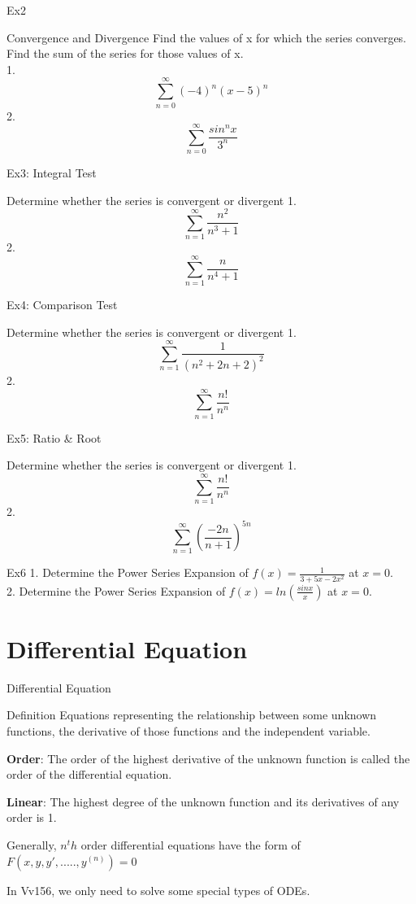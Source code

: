 \documentclass{beamer}
\begin{document}
\begin{frame}{Ex2}
    \begin{block}{Convergence and Divergence}
    Find the values of x for which the series converges. Find the sum of
the series for those values of x.\\
        1. $$\sum\limits_{n=0}^{\infty}(-4)^n(x-5)^n$$
        2. $$\sum\limits_{n=0}^{\infty}\frac{sin^n x}{3^n}$$
    \end{block}
\end{frame}
\begin{frame}{Ex3: Integral Test}
    \begin{block}{Determine whether the series is convergent or divergent}
    1.$$\sum\limits_{n=1}^{\infty} \frac{n^2}{n^3+1}$$
    2.$$\sum\limits_{n=1}^{\infty} \frac{n}{n^4+1}$$
    \end{block}
\end{frame}
\begin{frame}{Ex4: Comparison Test}
    \begin{block}{Determine whether the series is convergent or divergent}
    1.$$\sum\limits_{n=1}^{\infty} \frac{1}{(n^2+2n+2)^2}$$
    2.$$\sum\limits_{n=1}^{\infty} \frac{n!}{n^n}$$
    \end{block}
\end{frame}
\begin{frame}{Ex5: Ratio \& Root}
    \begin{block}{Determine whether the series is convergent or divergent}
    1.$$\sum\limits_{n=1}^{\infty} \frac{n!}{n^n}$$
    2.$$\sum\limits_{n=1}^{\infty} (\frac{-2n}{n+1})^{5n}$$
    \end{block}
\end{frame}
\begin{frame}{Ex6}
    1. Determine the Power Series Expansion of $f (x) = \frac{1}{3+5x-2x^2}$
at $x = 0$.\\
2. Determine the Power Series Expansion of $f (x) = ln (\frac{sinx}{x})$
at $x = 0$.
\end{frame}
\section{Differential Equation}

\begin{frame}{Differential Equation}
    \begin{block}{Definition}
        Equations representing the relationship between some unknown functions, the derivative of those functions and the independent variable.
        
        \textbf{Order}: The order of the highest derivative of the unknown function is called the order of the differential equation.
        
        \textbf{Linear}: The highest degree of the unknown function and its derivatives of any order is 1.
        
        Generally, $n^th$ order differential equations have the form of $F(x, y, y', ....., y^{(n)}) = 0$
    \end{block}
    In Vv156, we only need to solve some special types of ODEs.
\end{frame}
\end{document}
